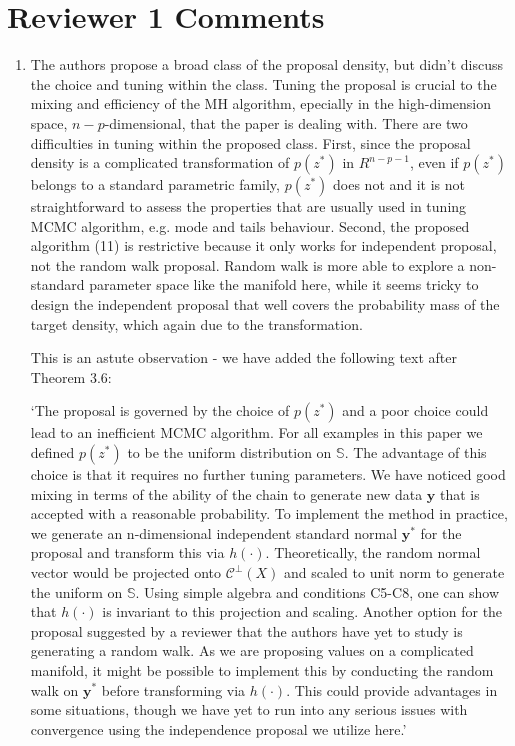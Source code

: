 \documentclass{article}
\newcommand{\mb}{\mathbf}
\newcommand{\mc}{\mathcal}
\newcommand{\response}[1]{{\color{blue}#1}}
\begin{document}
\section{Reviewer 1 Comments}

\begin{enumerate}
\item The authors propose a broad class of the proposal density, but didn't discuss the choice and tuning within the class. Tuning the proposal is crucial to the mixing and efficiency of the MH algorithm, epecially in the high-dimension space, $n-p$-dimensional, that the paper is dealing with. There are two difficulties in tuning within the proposed class. First, since the proposal density is a complicated transformation of $p(z^{*})$ in $R^{n-p-1}$, even if $p(z^{*})$ belongs to a standard parametric family, $p(z^{*})$ does not and it is not straightforward to assess the properties that are usually used in tuning MCMC algorithm, e.g. mode and
tails behaviour. Second, the proposed algorithm (11) is restrictive because it only works for independent proposal, not the random walk proposal. Random walk is more able to explore a non-standard parameter space like the manifold here, while it seems tricky to design the independent proposal that well covers the probability mass of the target density, which again due to the transformation.

\response{This is an astute observation - we have added the following text after Theorem 3.6:

`The proposal is governed by the choice of $p(z^{*})$ and a poor choice could lead to an inefficient MCMC algorithm. For all examples in this paper we defined $p(z^{*})$ to be the uniform distribution on $\mathbb{S}$. The advantage of this choice is that it requires no further tuning parameters.  We have noticed good mixing in terms of the ability of the chain to generate new data $\mb y$ that is accepted with a reasonable probability. To implement the method in practice, we generate an n-dimensional independent standard normal $\mb y^{*}$ for the proposal and transform this via $h(\cdot)$. Theoretically, the random normal vector would be projected onto $\mc{C}^{\perp}(X)$ and scaled to unit norm to generate the uniform on $\mathbb{S}$. Using simple algebra and conditions C5-C8, one can show that $h(\cdot)$ is invariant to this projection and scaling. Another option for the proposal suggested by a reviewer that the authors have yet to study is generating a random walk. As we are proposing values on a complicated manifold, it might be possible to implement this by conducting the random walk on $\mb y^{*}$ before transforming via $h(\cdot)$. This could provide advantages in some situations, though we have yet to run into any serious issues with convergence using the independence proposal we utilize here.'


}
\end{enumerate}
\end{document}
